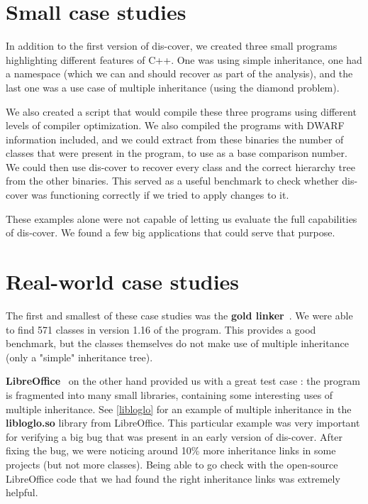 \documentclass[a4paper,11pt,oneside]{report}
\begin{document}


\section{Small case studies}

In addition to the first version of dis-cover, we created three small programs 
highlighting different features of C++.
One was using simple inheritance,
one had a namespace (which we can and should recover as part of the analysis),
and the last one was a use case of multiple inheritance (using the diamond 
problem).

We also created a script that would compile these three programs using
different levels of compiler optimization.
We also compiled the programs with DWARF information included, and we could
extract from these binaries the number of classes that were present in the
program, to use as a base comparison number.
We could then use dis-cover to recover every class and the correct hierarchy
tree from the other binaries.
This served as a useful benchmark to check whether dis-cover was functioning 
correctly if we tried to apply changes to it.

These examples alone were not capable of letting us evaluate the full 
capabilities of dis-cover.
We found a few big applications that could serve that purpose.

\section{Real-world case studies}

The first and smallest of these case studies was the \textbf{gold 
linker}~\cite{gold}.
We were able to find 571 classes in version 1.16 of the program.
This provides a good benchmark, but the classes themselves do not make use of 
multiple inheritance (only a "simple" inheritance tree).

\textbf{LibreOffice}~\cite{libreoffice} on the other hand provided us with a 
great test case :
the program is fragmented into many small libraries, containing some 
interesting uses of multiple inheritance.
See \autoref{libloglo} for an example of multiple inheritance in the 
\textbf{libloglo.so} library from LibreOffice.
This particular example was very important for verifying a big bug that was 
present in an early version of dis-cover.
After fixing the bug, we were noticing around 10\% more inheritance links in 
some projects (but not more classes).
Being able to go check with the open-source LibreOffice code that we had found 
the right inheritance links was extremely helpful.
\end{document}
